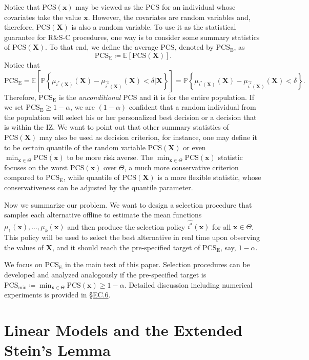 \documentclass[ijoc,nonblindrev]{informs3}
\def\E{\mathbb{E}}
\def\pr{\mathbb{P}}
\def\bx{{\bm x}}
\def\bX{{\bm X}}
\def\PCS{\mathrm{PCS}}
\def\PCSE{\mathrm{PCS}_{\mathrm{E}}}
\def\PCSmin{\mathrm{PCS}_{\mathrm{min}}}
\begin{document}
Notice that $\text{PCS}(\bx)$ may be viewed as the PCS for an individual whose covariates take the value $\bx$.
However, the covariates are random variables and, therefore, $\PCS(\bX)$ is also a random variable.
To use it as the statistical guarantee for R\&S-C procedures, one way is to consider some summary statistics of $\PCS(\bX)$.
To that end, we define the average PCS, denoted by $\PCSE$, as
\begin{equation} \label{eq-PCSE}
\PCSE \coloneqq \E \left[ \text{PCS}(\bX) \right].
\end{equation}
Notice that
\[\PCSE = \E\left[\pr \left\{ \mu_{i^*(\bX)}(\bX) - \mu_{\widehat{i^*}(\bX)}(\bX)  < \delta \big| \bX \right\}\right] = \pr \left\{ \mu_{i^*(\bX)}(\bX) - \mu_{\widehat{i^*}(\bX)}(\bX)  < \delta \right\}.\]
Therefore, $\PCSE$ is the \textit{unconditional} PCS and it is for the entire population.
If we set $\PCSE\ge 1-\alpha$, we are $(1-\alpha)$ confident that a random individual from the population will select his or her personalized best decision or a decision that is within the IZ.
We want to point out that other summary statistics of $\PCS(\bX)$ may also be used as decision criterion, for instance, one may define it to be certain quantile of the random variable $\PCS(\bX)$ or even $\min_{\bx\in\Theta} \PCS(\bx)$ to be more risk averse.
The $\min_{\bx\in\Theta} \PCS(\bx)$ statistic focuses on the worst $\PCS(\bx)$ over $\Theta$, a much more conservative criterion compared to $\PCSE$, while quantile of $\PCS(\bX)$ is a more flexible statistic, whose conservativeness can be adjusted by the quantile parameter.


Now we summarize our problem.
We want to design a selection procedure that samples each alternative offline to estimate the mean functions $\mu_1(\bx),\ldots,\mu_k(\bx)$ and then produce the selection policy $\widehat{i^*}(\bx)$ for all $\bx\in\Theta$.
This policy will be used to select the best alternative in real time upon observing the values of $\bX$, and it should reach the pre-specified target of $\PCSE$, say, $1-\alpha$.

\begin{remark}
We focus on $\PCSE$ in the main text of this paper.
Selection procedures can be developed and analyzed analogously if  the pre-specified target is $\PCSmin \coloneqq \min_{\bx\in\Theta} \PCS(\bx)\geq 1-\alpha$.
Detailed discussion including numerical experiments is provided in \S\hyperlink{EC.6}{EC.6}.
\end{remark}

\section{Linear Models and the Extended Stein's Lemma} \label{sec-linear}
\end{document}
